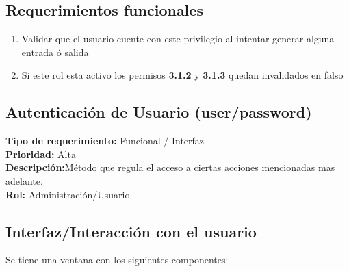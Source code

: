\documentclass[a4paper,DIV=12]{scrreprt}
\begin{document}
\subsection*{Requerimientos funcionales}
\begin{enumerate}
	\item{Validar que el usuario cuente con este privilegio al intentar generar alguna entrada ó salida}
	\item{Si este rol esta activo los permisos \textbf{3.1.2} y \textbf{3.1.3} quedan invalidados en falso}
\end{enumerate}
\newpage
\setcounter{section}{2}
\setcounter{subsection}{-1}
\subsection{Autenticación de Usuario (user/password)}
\noindent
\textbf{Tipo de requerimiento:} Funcional / Interfaz\\
\textbf{Prioridad:} Alta\\
\textbf{Descripción:}Método que regula el acceso a ciertas acciones mencionadas mas adelante.\\
\textbf{Rol:} Administración/Usuario.
\subsection*{Interfaz/Interacción con el usuario}

Se tiene una ventana con los siguientes componentes: 
\end{document}

